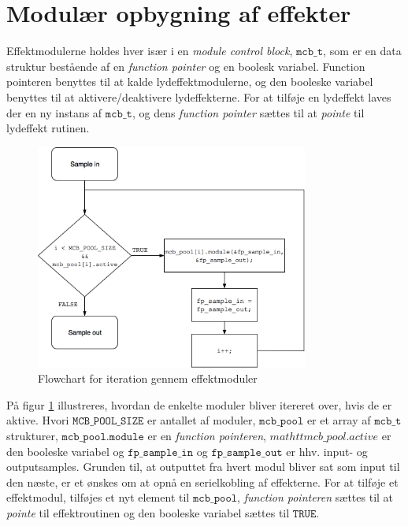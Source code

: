\section{Modulær opbygning af effekter}
Effektmodulerne holdes hver især i en \textit{module control block}, $\mathtt{mcb\_t}$,  som er en data struktur bestående af en \textit{function pointer} og en boolesk variabel.
Function pointeren benyttes til at kalde lydeffektmodulerne, og den booleske variabel benyttes til at aktivere/deaktivere lydeffekterne.\newline
For at tilføje en lydeffekt laves der en ny instans af $\mathtt{mcb\_t}$, og dens \textit{function pointer} sættes til at \textit{pointe} til lydeffekt rutinen.\newline
\begin{figure}[!ht]
	\centering
	\includegraphics[width=0.8\textwidth]{billeder/Flowchart_for_effektmoduler.png}
	\caption{Flowchart for iteration gennem effektmoduler}
	\label{fig:effektmoduler}
\end{figure}

På figur \ref{fig:effektmoduler} illustreres, hvordan de enkelte moduler bliver itereret over, hvis de er aktive.
Hvori $\mathtt{MCB\_POOL\_SIZE}$ er antallet af moduler, $\mathtt{mcb\_pool}$ er et array af $\mathtt{mcb\_t}$ strukturer, $\mathtt{mcb\_pool.module}$ er en \textit{function pointeren}, $mathtt{mcb\_pool.active}$ er den booleske variabel og $\mathtt{fp\_sample\_in}$ og $\mathtt{fp\_sample\_out}$ er hhv. input- og outputsamples.
Grunden til, at outputtet fra hvert modul bliver sat som input til den næste, er et ønskes om at opnå en serielkobling af effekterne.
For at tilføje et effektmodul, tilføjes et nyt element til $\mathtt{mcb\_pool}$, \textit{function pointeren} sættes til at \textit{pointe} til effektroutinen og den booleske variabel sættes til $\mathtt{TRUE}$.

